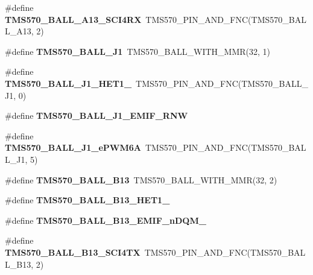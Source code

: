 \begin{DoxyCompactItemize}
\item 
\mbox{\label{tms570lc4357-pins_8h_afd68b8b67be7111e24a5b4f1d09cac3e}} 
\#define {\bfseries T\+M\+S570\+\_\+\+B\+A\+L\+L\+\_\+\+A13\+\_\+\+S\+C\+I4\+RX}~T\+M\+S570\+\_\+\+P\+I\+N\+\_\+\+A\+N\+D\+\_\+\+F\+NC(T\+M\+S570\+\_\+\+B\+A\+L\+L\+\_\+\+A13, 2)
\item 
\mbox{\label{tms570lc4357-pins_8h_a0a330fb64bb6b595bacfcee207c3bea6}} 
\#define {\bfseries T\+M\+S570\+\_\+\+B\+A\+L\+L\+\_\+\+J1}~T\+M\+S570\+\_\+\+B\+A\+L\+L\+\_\+\+W\+I\+T\+H\+\_\+\+M\+MR(32, 1)
\item 
\mbox{\label{tms570lc4357-pins_8h_ad1e1871e9d290b884a28dc93f6ba6e74}} 
\#define {\bfseries T\+M\+S570\+\_\+\+B\+A\+L\+L\+\_\+\+J1\+\_\+\+H\+E\+T1\+\_}~T\+M\+S570\+\_\+\+P\+I\+N\+\_\+\+A\+N\+D\+\_\+\+F\+NC(T\+M\+S570\+\_\+\+B\+A\+L\+L\+\_\+\+J1, 0)
\item 
\#define {\bfseries T\+M\+S570\+\_\+\+B\+A\+L\+L\+\_\+\+J1\+\_\+\+E\+M\+I\+F\+\_\+\+R\+NW}
\item 
\mbox{\label{tms570lc4357-pins_8h_a1c52d733ef6221bf2c1822e5500a296f}} 
\#define {\bfseries T\+M\+S570\+\_\+\+B\+A\+L\+L\+\_\+\+J1\+\_\+e\+P\+W\+M6A}~T\+M\+S570\+\_\+\+P\+I\+N\+\_\+\+A\+N\+D\+\_\+\+F\+NC(T\+M\+S570\+\_\+\+B\+A\+L\+L\+\_\+\+J1, 5)
\item 
\mbox{\label{tms570lc4357-pins_8h_aecebac647119702ae531413876d65ccf}} 
\#define {\bfseries T\+M\+S570\+\_\+\+B\+A\+L\+L\+\_\+\+B13}~T\+M\+S570\+\_\+\+B\+A\+L\+L\+\_\+\+W\+I\+T\+H\+\_\+\+M\+MR(32, 2)
\item 
\#define {\bfseries T\+M\+S570\+\_\+\+B\+A\+L\+L\+\_\+\+B13\+\_\+\+H\+E\+T1\+\_}
\item 
\#define {\bfseries T\+M\+S570\+\_\+\+B\+A\+L\+L\+\_\+\+B13\+\_\+\+E\+M\+I\+F\+\_\+n\+D\+Q\+M\+\_}
\item 
\mbox{\label{tms570lc4357-pins_8h_a2c7dc9d1b28328bfb8c026a93b72b488}} 
\#define {\bfseries T\+M\+S570\+\_\+\+B\+A\+L\+L\+\_\+\+B13\+\_\+\+S\+C\+I4\+TX}~T\+M\+S570\+\_\+\+P\+I\+N\+\_\+\+A\+N\+D\+\_\+\+F\+NC(T\+M\+S570\+\_\+\+B\+A\+L\+L\+\_\+\+B13, 2)
\item 
\mbox{\label{tms570lc4357-pins_8h_a78b9418ae1029d72d28530236030e9ff}} 

\end{DoxyCompactItemize}
